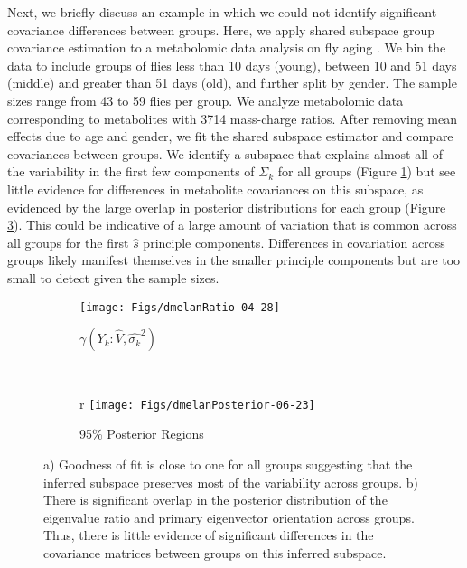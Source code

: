 \documentclass[12pt]{article}
\begin{document}
Next, we briefly discuss an example in which we could not identify
significant covariance differences between groups.  Here, we apply
shared subspace group covariance estimation to a metabolomic data
analysis on fly aging \citep{Hoffman2014}.  We bin the data to include
groups of flies less than 10 days (young), between 10 and 51 days
(middle) and greater than 51 days (old), and further split by
gender. The sample sizes range from 43 to 59 flies per group.  We
analyze metabolomic data corresponding to metabolites with 3714
mass-charge ratios.  After removing mean effects due to age and
gender, we fit the shared subspace estimator and compare covariances
between groups.  We identify a subspace that explains almost all of
the variability in the first few components of $\Sigma_k$ for all
groups (Figure \ref{fig:dmelanRatio}) but see little evidence for
differences in metabolite covariances on this subspace, as evidenced
by the large overlap in posterior distributions for each group (Figure
\ref{fig:dmelanPosterior}). This could be indicative of a large amount
of variation that is common across all groups for the first $\hat{s}$
principle components. Differences in covariation across groups likely
manifest themselves in the smaller principle components but are too
small to detect given the sample sizes.

\begin{figure}[t]
    \centering
    \begin{subfigure}[b]{0.45\textwidth}
        \texttt{[image: Figs/dmelanRatio-04-28]}
        \caption{$\gamma(Y_k: \hat{V}, \hat{\sigma_k}^2)$}
        \label{fig:dmelanRatio}
      \end{subfigure}
    ~ %
    \begin{subfigure}[b]{0.45\textwidth}r
        \texttt{[image: Figs/dmelanPosterior-06-23]}
        \caption{95\% Posterior Regions}
        \label{fig:dmelanPosterior}
    \end{subfigure}
    \caption{a) Goodness of fit is close to one for all groups
      suggesting that the inferred subspace preserves most of the
      variability across groups. b) There is significant overlap in
      the posterior distribution of the eigenvalue ratio and primary
      eigenvector orientation across groups. Thus, there is little
      evidence of significant differences in the covariance matrices
      between groups on this inferred subspace.  }
\end{figure}
\end{document}
